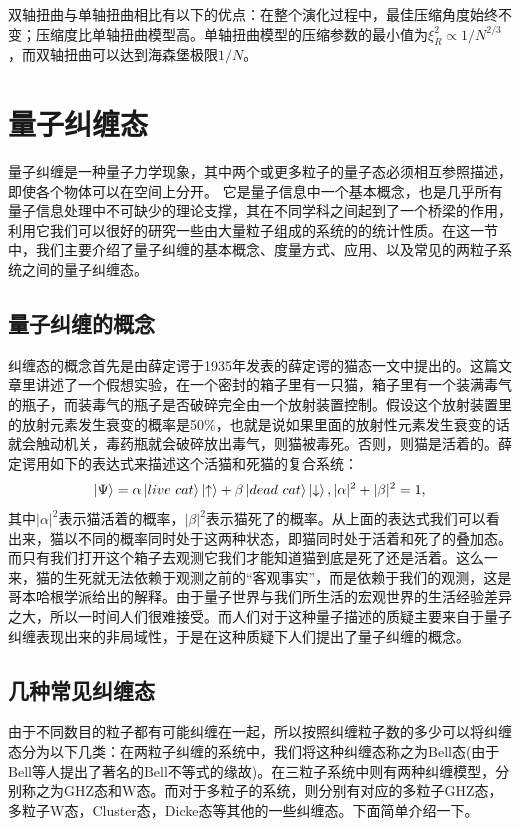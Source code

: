 双轴扭曲与单轴扭曲相比有以下的优点：在整个演化过程中，最佳压缩角度始终不变；压缩度比单轴扭曲模型高。单轴扭曲模型的压缩参数的最小值为$\xi_R^2\propto1/N^{2/3}$，而双轴扭曲可以达到海森堡极限$1/N$。


\vbox{}
\section{量子纠缠态}
\vbox{}
量子纠缠是一种量子力学现象，其中两个或更多粒子的量子态必须相互参照描述，即使各个物体可以在空间上分开。
它是量子信息中一个基本概念，也是几乎所有量子信息处理中不可缺少的理论支撑，其在不同学科之间起到了一个桥梁的作用，利用它我们可以很好的研究一些由大量粒子组成的系统的的统计性质。在这一节中，我们主要介绍了量子纠缠的基本概念、度量方式、应用、以及常见的两粒子系统之间的量子纠缠态。

\subsection{量子纠缠的概念}
纠缠态的概念首先是由薛定谔于1935年发表的薛定谔的猫态一文\cite{article1935}中提出的。这篇文章里讲述了一个假想实验，在一个密封的箱子里有一只猫，箱子里有一个装满毒气的瓶子，而装毒气的瓶子是否破碎完全由一个放射装置控制。假设这个放射装置里的放射元素发生衰变的概率是50$\%$，也就是说如果里面的放射性元素发生衰变的话就会触动机关，毒药瓶就会破碎放出毒气，则猫被毒死。否则，则猫是活着的。薛定谔用如下的表达式来描述这个活猫和死猫的复合系统：
\begin{align}
\ket{\Psi}=\alpha\ket{live\  cat}\ket{\uparrow}+\beta\ket{dead\  cat}\ket{\downarrow},|\alpha|^2+|\beta|^2=1,
\end{align}
其中$|\alpha|^2$表示猫活着的概率，$|\beta|^2$表示猫死了的概率。从上面的表达式我们可以看出来，猫以不同的概率同时处于这两种状态，即猫同时处于活着和死了的叠加态。而只有我们打开这个箱子去观测它我们才能知道猫到底是死了还是活着。这么一来，猫的生死就无法依赖于观测之前的“客观事实”，而是依赖于我们的观测，这是哥本哈根学派给出的解释。由于量子世界与我们所生活的宏观世界的生活经验差异之大，所以一时间人们很难接受。而人们对于这种量子描述的质疑主要来自于量子纠缠表现出来的非局域性，于是在这种质疑下人们提出了量子纠缠的概念。
\subsection{几种常见纠缠态}
由于不同数目的粒子都有可能纠缠在一起，所以按照纠缠粒子数的多少可以将纠缠态分为以下几类：在两粒子纠缠的系统中，我们将这种纠缠态称之为Bell态\cite{bell1964einstein}(由于Bell等人提出了著名的Bell不等式的缘故)。在三粒子系统中则有两种纠缠模型，分别称之为GHZ态\cite{greenberger2000similarities}和W态\cite{dur2000three}。而对于多粒子的系统，则分别有对应的多粒子GHZ态，多粒子W态，Cluster态，Dicke态等其他的一些纠缠态。下面简单介绍一下。

